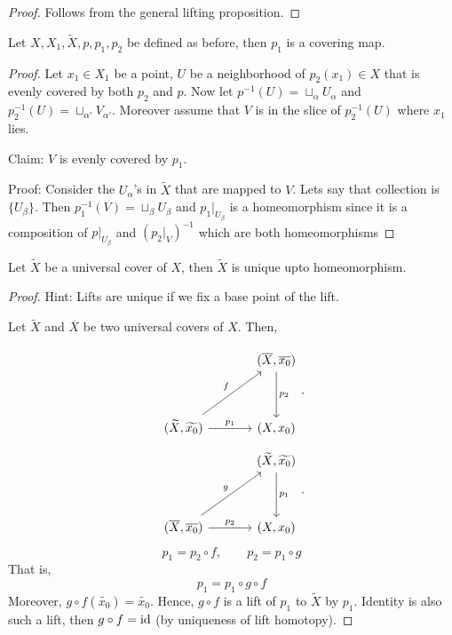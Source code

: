 \documentclass[12pt]{amsart}
\begin{document}
\begin{proof}
    Follows from the general lifting proposition. 
\end{proof}

\begin{lemma}
    Let $X, X_1, \widetilde{X}, p, p_1, p_2$ be defined as before, then $p_1$ is a covering map.  
\end{lemma}

\begin{proof}
    Let $x_1 \in X_1$ be a point, $U$ be a neighborhood of $p_2(x_1) \in X$ that is evenly covered by both $p_2$ and $p$. Now let $p^{-1}(U) = \sqcup_\alpha U_\alpha$ and $p_2^{-1}(U) = \sqcup_{\alpha'} V_{\alpha'}$. Moreover assume that $V$ is in the slice of $p_2^{-1}(U)$ where $x_1$ lies. 

    Claim: $V$ is evenly covered by $p_1$. 

    Proof: Consider the $U_\alpha$'s in $\widetilde{X}$ that are mapped to $V$. Lets say that collection is $\{U_\beta\}$. Then $p_1^{-1}(V) = \sqcup_\beta U_\beta$ and $p_1 |_{U_\beta}$ is a homeomorphism since it is a composition of $p|_{U_\beta}$ and $(p_2 |_V)^{-1}$ which are both homeomorphisms 
\end{proof}

\begin{theorem}
    Let $\widetilde{X}$ be a universal cover of $X$, then $\widetilde{X}$ is unique upto homeomorphism. 
\end{theorem}

\begin{proof}
    Hint: Lifts are unique if we fix a base point of the lift. 


    Let $\widetilde{X}$ and $\overline{X}$ be two universal covers of $X$. Then, 

    \[
		\begin{tikzcd}[row sep = 3.5em, column sep = 3.5em]
		{} & (\overline{X}, \overline{x_0}) \arrow[d, "p_2"] \\
        (\widetilde{X}, \widetilde{x_0}) \arrow[ur, "f"] \arrow[r, "p_1"] & (X, x_0) 
		\end{tikzcd}.
	\]
    \[
		\begin{tikzcd}[row sep = 3.5em, column sep = 3.5em]
		{} & (\widetilde{X}, \widetilde{x_0}) \arrow[d, "p_1"] \\
        (\overline{X}, \overline{x_0}) \arrow[ur, "g"] \arrow[r, "p_2"] & (X, x_0) 
		\end{tikzcd}.
	\]
    \[p_1 = p_2 \circ f, \qquad p_2 = p_1 \circ g\]
    That is, 
    \[p_1 = p_1 \circ g \circ f\]
    Moreover, $g \circ f(\widetilde{x_0}) = \widetilde{x_0}$. Hence, $g \circ f$ is a lift of $p_1$ to $\widetilde{X}$ by $p_1$. Identity is also such a lift, then $g \circ f = \operatorname{id}$ (by uniqueness of lift homotopy). 
\end{proof}
\end{document}
